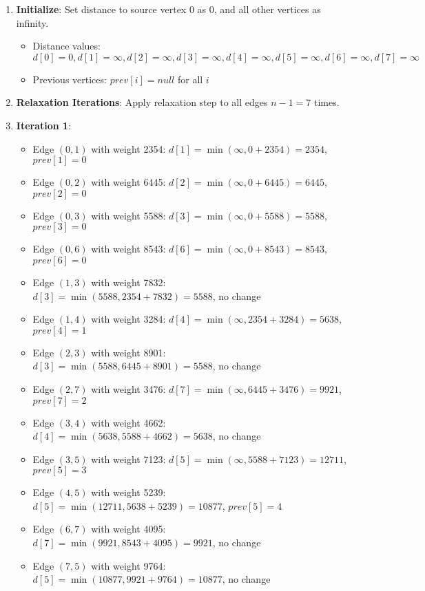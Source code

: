 \documentclass{article}
\theoremstyle{definition}
\begin{document}
\begin{enumerate}
\item \textbf{Initialize}: Set distance to source vertex 0 as 0, and all other vertices as infinity.
   \begin{itemize}
   \item Distance values: $d[0] = 0, d[1] = \infty, d[2] = \infty, d[3] = \infty, d[4] = \infty, d[5] = \infty, d[6] = \infty, d[7] = \infty$
   \item Previous vertices: $prev[i] = null$ for all $i$
   \end{itemize}

\item \textbf{Relaxation Iterations}: Apply relaxation step to all edges $n-1 = 7$ times.
   
   \item \textbf{Iteration 1}:
   \begin{itemize}
   \item Edge $(0,1)$ with weight 2354: $d[1] = \min(\infty, 0 + 2354) = 2354$, $prev[1] = 0$
   \item Edge $(0,2)$ with weight 6445: $d[2] = \min(\infty, 0 + 6445) = 6445$, $prev[2] = 0$
   \item Edge $(0,3)$ with weight 5588: $d[3] = \min(\infty, 0 + 5588) = 5588$, $prev[3] = 0$
   \item Edge $(0,6)$ with weight 8543: $d[6] = \min(\infty, 0 + 8543) = 8543$, $prev[6] = 0$
   \item Edge $(1,3)$ with weight 7832: $d[3] = \min(5588, 2354 + 7832) = 5588$, no change
   \item Edge $(1,4)$ with weight 3284: $d[4] = \min(\infty, 2354 + 3284) = 5638$, $prev[4] = 1$
   \item Edge $(2,3)$ with weight 8901: $d[3] = \min(5588, 6445 + 8901) = 5588$, no change
   \item Edge $(2,7)$ with weight 3476: $d[7] = \min(\infty, 6445 + 3476) = 9921$, $prev[7] = 2$
   \item Edge $(3,4)$ with weight 4662: $d[4] = \min(5638, 5588 + 4662) = 5638$, no change
   \item Edge $(3,5)$ with weight 7123: $d[5] = \min(\infty, 5588 + 7123) = 12711$, $prev[5] = 3$
   \item Edge $(4,5)$ with weight 5239: $d[5] = \min(12711, 5638 + 5239) = 10877$, $prev[5] = 4$
   \item Edge $(6,7)$ with weight 4095: $d[7] = \min(9921, 8543 + 4095) = 9921$, no change
   \item Edge $(7,5)$ with weight 9764: $d[5] = \min(10877, 9921 + 9764) = 10877$, no change
   \end{itemize}
   

\end{enumerate}
\end{document}
